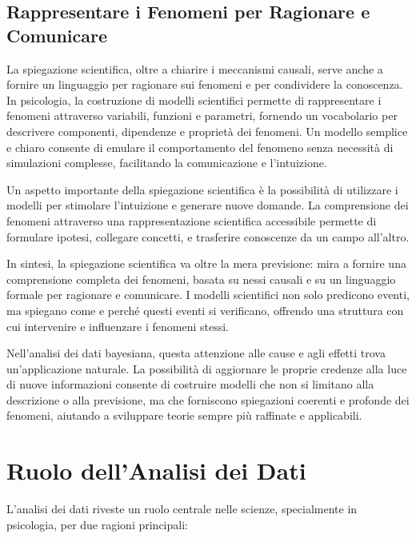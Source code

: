 \documentclass[
  letterpaper,
  DIV=11,
  numbers=noendperiod]{scrreprt}
\theoremstyle{definition}
\theoremstyle{remark}
\begin{document}
\subsection{Rappresentare i Fenomeni per Ragionare e
Comunicare}\label{rappresentare-i-fenomeni-per-ragionare-e-comunicare}

La spiegazione scientifica, oltre a chiarire i meccanismi causali, serve
anche a fornire un linguaggio per ragionare sui fenomeni e per
condividere la conoscenza. In psicologia, la costruzione di modelli
scientifici permette di rappresentare i fenomeni attraverso variabili,
funzioni e parametri, fornendo un vocabolario per descrivere componenti,
dipendenze e proprietà dei fenomeni. Un modello semplice e chiaro
consente di emulare il comportamento del fenomeno senza necessità di
simulazioni complesse, facilitando la comunicazione e l'intuizione.

Un aspetto importante della spiegazione scientifica è la possibilità di
utilizzare i modelli per stimolare l'intuizione e generare nuove
domande. La comprensione dei fenomeni attraverso una rappresentazione
scientifica accessibile permette di formulare ipotesi, collegare
concetti, e trasferire conoscenze da un campo all'altro.

In sintesi, la spiegazione scientifica va oltre la mera previsione: mira
a fornire una comprensione completa dei fenomeni, basata su nessi
causali e su un linguaggio formale per ragionare e comunicare. I modelli
scientifici non solo predicono eventi, ma spiegano come e perché questi
eventi si verificano, offrendo una struttura con cui intervenire e
influenzare i fenomeni stessi.

Nell'analisi dei dati bayesiana, questa attenzione alle cause e agli
effetti trova un'applicazione naturale. La possibilità di aggiornare le
proprie credenze alla luce di nuove informazioni consente di costruire
modelli che non si limitano alla descrizione o alla previsione, ma che
forniscono spiegazioni coerenti e profonde dei fenomeni, aiutando a
sviluppare teorie sempre più raffinate e applicabili.

\section{Ruolo dell'Analisi dei Dati}\label{ruolo-dellanalisi-dei-dati}

L'analisi dei dati riveste un ruolo centrale nelle scienze, specialmente
in psicologia, per due ragioni principali:
\end{document}
